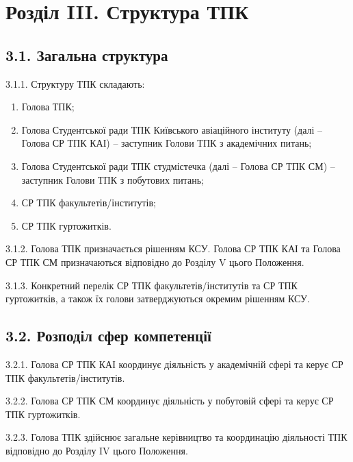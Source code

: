 \section*{Розділ III. Структура ТПК}

\subsection*{3.1. Загальна структура}
    3.1.1. Структуру ТПК складають:

        \begin{enumerate}[label=\alph*)]
            \item Голова ТПК;
            \item Голова Студентської ради ТПК Київського авіаційного інституту (далі -- Голова СР ТПК КАІ) -- заступник Голови ТПК з академічних питань;
            \item Голова Студентської ради ТПК студмістечка (далі -- Голова СР ТПК СМ) -- заступник Голови ТПК з побутових питань;
            \item СР ТПК факультетів/інститутів;
            \item СР ТПК гуртожитків.
        \end{enumerate}

    3.1.2. Голова ТПК призначається рішенням КСУ. Голова СР ТПК КАІ та Голова СР ТПК СМ призначаються відповідно до Розділу V цього Положення.

    3.1.3. Конкретний перелік СР ТПК факультетів/інститутів та СР ТПК гуртожитків, а також їх голови затверджуються окремим рішенням КСУ.

\subsection*{3.2. Розподіл сфер компетенції}
    3.2.1. Голова СР ТПК КАІ координує діяльність у академічній сфері та керує СР ТПК факультетів/інститутів.

    3.2.2. Голова СР ТПК СМ координує діяльність у побутовій сфері та керує СР ТПК гуртожитків.

    3.2.3. Голова ТПК здійснює загальне керівництво та координацію діяльності ТПК відповідно до Розділу IV цього Положення.
